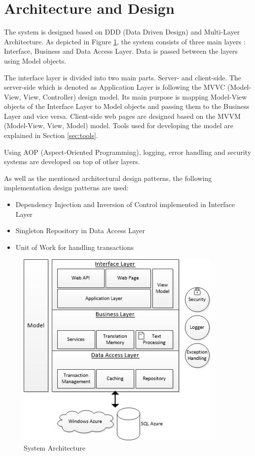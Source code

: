 \section{Architecture and Design}
\label{sec:architecture}
The system is designed based on DDD (Data Driven Design) and Multi-Layer Architecture. As depicted in Figure \ref{fig:architecture}, the system consists of three main layers : Interface, Business and Data Access Layer. Data is passed between the layers using Model objects.

The interface layer is divided into two main parts. Server- and client-side. The server-side which is denoted as Application Layer is following the MVVC (Model-View, View, Controller) design model. Its main purpose is mapping Model-View objects of the Interface Layer to Model objects and passing them to the Business Layer and vice versa. Client-side web pages are designed based on the MVVM (Model-View, View, Model) model. Tools used for developing the model are explained in Section \ref{sec:tools}.

Using AOP (Aspect-Oriented Programming), logging, error handling and security systems are developed on top of other layers.

As well as the mentioned architectural design patterns, the following implementation design patterns are used:
\begin{itemize}
	\item Dependency Injection and Inversion of Control implemented in Interface Layer
	\item Singleton Repository in Data Access Layer
	\item Unit of Work for handling transactions
\end{itemize} 

\begin{figure}[h]
\begin{center}
\includegraphics[scale=0.8]{figures/architecture.jpg}
\caption{System Architecture
\label{fig:architecture}}
\end{center}
\end{figure}
